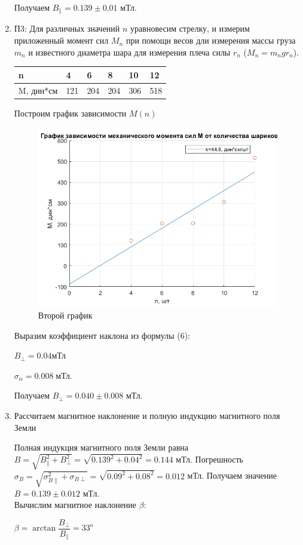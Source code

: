 \documentclass[a4paper,12pt]{article}
\begin{document}
\begin{enumerate}
Получаем $B_\parallel = 0.139 \pm 0.01$ мТл.
\item П3: Для различных значений $n$ уравновесим стрелку, и измерим приложенный момент сил $M_n$ при помощи весов дли измерения массы груза $m_n$ и известного диаметра шара для измерения плеча силы $r_n$ ($M_n = m_n g r_n$).
\begin{table}[h!]
\centering
\begin{tabular}{|l|l|l|l|l|l|}
\hline
n         & 4   & 6   & 8   & 10  & 12  \\ \hline
M, дин*см & 121 & 204 & 204 & 306 & 518 \\ \hline
\end{tabular}
\end{table}
Построим график зависимости $M(n)$
\begin{figure}[h!]
\begin{center}
\includegraphics[scale=0.6]{plot2.png}
\caption{Второй график}
\label{plot2}
\end{center}
\end{figure}

Выразим коэффициент наклона из формулы (6):

$ B_\perp = 0.04 \text{мТл}
$

$ \sigma_\alpha = 0.008 \; \text{мТл}.
$

Получаем $B_\perp = 0.040 \pm 0.008$ мТл.
\item Рассчитаем магнитное наклонение и полную индукцию магнитного поля Земли 

Полная индукция магнитного поля Земли равна $B = \sqrt{B_\parallel^2 + B_\perp^2} = \sqrt{0.139^2 + 0.04^2} = 0.144$ мТл. Погрешность $\sigma_B = \sqrt{\sigma_{B \parallel}^2 + \sigma_{B \perp}} = \sqrt{0.09^2 + 0.08^2} = 0.012$ мТл. Получаем значение $B = 0.139 \pm 0.012$ мТл.
\\ Вычислим магнитное наклонение $\beta$:

$\beta =\arctan{\dfrac{B_{\perp}}{B_{\parallel}}} = 33^o
$

\end{enumerate}
\end{document}
